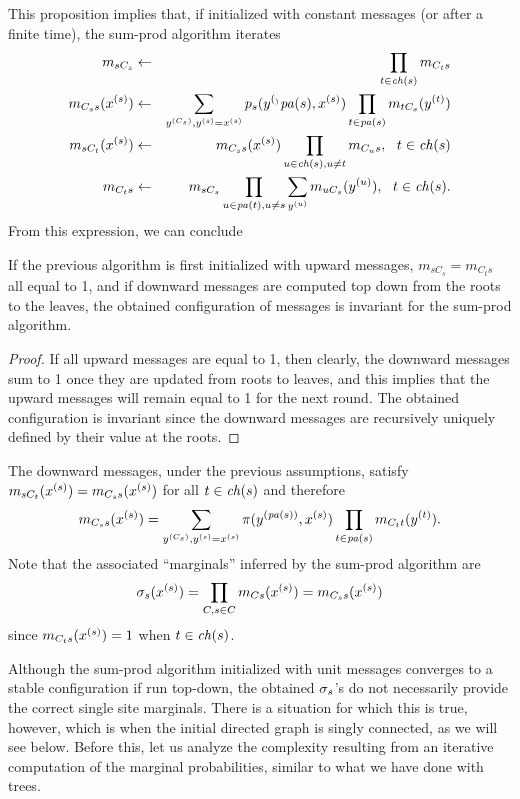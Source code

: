 This proposition implies that, if initialized with constant messages
(or after a finite time), the sum-prod algorithm iterates
\begin{eqnarray*}
m_{sC_s} &\leftarrow& \prod_{t\in {\mathit{ch}(s)}} m_{C_ts}\\
m_{C_ss}(x^{(s)}) &\leftarrow& \sum_{y^{(C_s)}, y^{(s)} = x^{(s)}} p_s(y^{(_)}{{\mathit{pa}(s)}}, x^{(s)}) \prod_{t\in
{\mathit{pa}(s)}} m_{tC_s}(y^{(t)})\\
m_{sC_t}(x^{(s)})  &\leftarrow& m_{C_ss}(x^{(s)}) \prod_{u\in {\mathit{ch}(s)}, u\neq t}
m_{C_us}, \  \ t\in {\mathit{ch}(s)}\\
m_{C_ts} &\leftarrow& m_{sC_s} \prod_{u\in {\mathit{pa}(t)}, u\neq s}
\sum_{y^{(u)}} m_{uC_s}(y^{(u)}), \  \ t\in {\mathit{ch}(s)}.
\end{eqnarray*}
From this expression, we can conclude
\begin{proposition}
\label{prop:bp.bay.2}
If the previous algorithm is first initialized with upward messages,
$m_{sC_s} = m_{C_ts}$ all equal to 1, and if  downward messages are
computed top down from the roots to the leaves, the obtained
configuration of messages is invariant for the sum-prod algorithm.
\end{proposition}
\begin{proof}
If all upward messages are equal to 1, then clearly, the downward
messages sum to 1 once they are updated from roots to leaves, and this
implies that the upward messages will remain equal to 1 for the next
round.  The obtained configuration is invariant since the downward
messages are recursively uniquely defined by their value at the roots.
\end{proof}
The downward messages, under the
previous assumptions, satisfy $m_{sC_t}(x^{(s)})  = m_{C_ss}(x^{(s)})$ for all
$t\in {\mathit{ch}(s)}$ and therefore
\begin{equation}
\label{eq:mes.bay}
m_{C_ss}(x^{(s)}) = \sum_{y^{(C_s)}, y^{(s)} = x^{(s)}} \pi(y^{({\mathit{pa}(s)})}, x^{(s)}) \prod_{t\in
{\mathit{pa}(s)}} m_{C_tt}(y^{(t)}).
\end{equation}
Note that the associated ``marginals'' inferred by the sum-prod algorithm are 
$$
\sigma_s(x^{(s)}) = \prod_{C, s\in C} m_{Cs}(x^{(s)}) = m_{C_ss}(x^{(s)}) 
$$
since $m_{C_ts}(x^{(s)}) = 1$ when $t\in {\mathit{ch}(s)}$.

Although the sum-prod algorithm initialized with unit messages
converges to a stable configuration if run top-down, the obtained
$\sigma_s$'s do not necessarily provide the correct single site marginals. There is a
situation for which this is true, however, which is when the initial
directed graph is singly connected, as we will see below. Before this,
let us analyze the complexity resulting from an iterative computation of
the marginal probabilities, similar to what we have done with trees.

